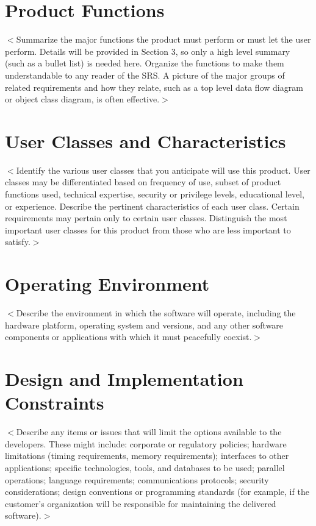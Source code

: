 \documentclass{scrreprt}
\begin{document}
\section{Product Functions}
$<$Summarize the major functions the product must perform or must let the user 
perform. Details will be provided in Section 3, so only a high level summary 
(such as a bullet list) is needed here. Organize the functions to make them 
understandable to any reader of the SRS. A picture of the major groups of 
related requirements and how they relate, such as a top level data flow diagram 
or object class diagram, is often effective.$>$

\section{User Classes and Characteristics}
$<$Identify the various user classes that you anticipate will use this product.  
User classes may be differentiated based on frequency of use, subset of product 
functions used, technical expertise, security or privilege levels, educational 
level, or experience. Describe the pertinent characteristics of each user class.  
Certain requirements may pertain only to certain user classes. Distinguish the 
most important user classes for this product from those who are less important 
to satisfy.$>$

\section{Operating Environment}
$<$Describe the environment in which the software will operate, including the 
hardware platform, operating system and versions, and any other software 
components or applications with which it must peacefully coexist.$>$

\section{Design and Implementation Constraints}
$<$Describe any items or issues that will limit the options available to the 
developers. These might include: corporate or regulatory policies; hardware 
limitations (timing requirements, memory requirements); interfaces to other 
applications; specific technologies, tools, and databases to be used; parallel 
operations; language requirements; communications protocols; security 
considerations; design conventions or programming standards (for example, if the 
customer’s organization will be responsible for maintaining the delivered 
software).$>$
\end{document}
